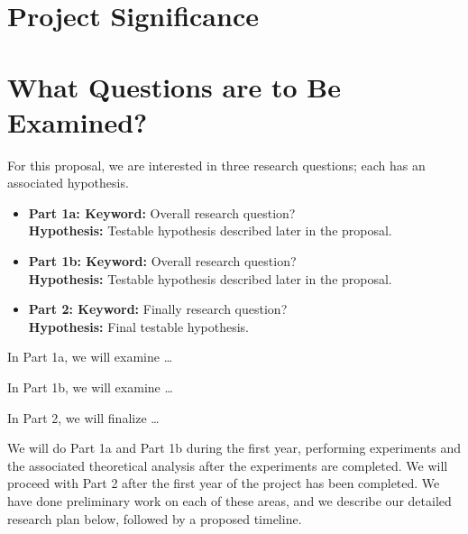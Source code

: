 \documentclass[10pt]{article}
\begin{document}
\lipsum[1]


\lipsum[2]
\section*{Project Significance} %

\lipsum[1]

\section*{What Questions are to Be Examined?} %

For this proposal, we are interested in three research questions; each has an associated hypothesis.
\begin{itemize}
	\item {\bf Part 1a: Keyword:} Overall research question?\\
	{\bf Hypothesis:} Testable hypothesis described later in the proposal.
     \vspace{-6pt}
    \item {\bf Part 1b: Keyword:} Overall research question? \\
    {\bf Hypothesis:} Testable hypothesis described later in the proposal. %
    \vspace{-6pt}
	\item {\bf Part 2: Keyword:} Finally research question?\\
	{\bf Hypothesis:} Final testable hypothesis. 
\end{itemize}

In Part 1a, we will examine \ldots \lipsum[1] %

In Part 1b, we will examine \ldots \lipsum[1] %

In Part 2, we will finalize \ldots 


We will do Part 1a and Part 1b during the first year, performing experiments and the associated theoretical analysis after the experiments are completed. We will proceed with Part 2 after the first year of the project has been completed. We have done preliminary work on each of these areas, and we describe our detailed research plan below, followed by a proposed timeline.
\end{document}
